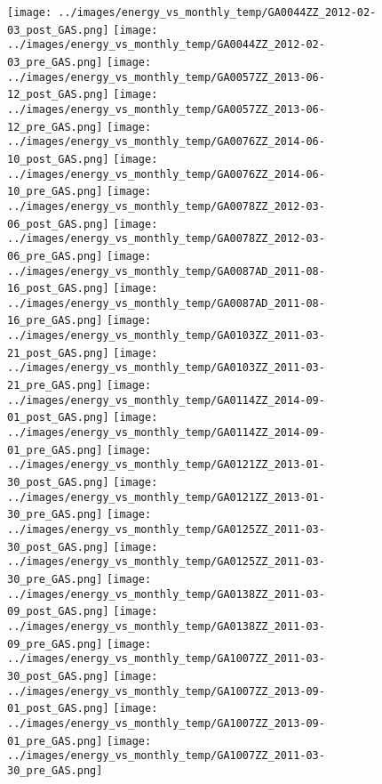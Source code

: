 \clearpage
\begin{figure}
\centering
\texttt{[image: ../images/energy\_vs\_monthly\_temp/GA0044ZZ\_2012-02-03\_post\_GAS.png]}
\texttt{[image: ../images/energy\_vs\_monthly\_temp/GA0044ZZ\_2012-02-03\_pre\_GAS.png]}
\texttt{[image: ../images/energy\_vs\_monthly\_temp/GA0057ZZ\_2013-06-12\_post\_GAS.png]}
\texttt{[image: ../images/energy\_vs\_monthly\_temp/GA0057ZZ\_2013-06-12\_pre\_GAS.png]}
\texttt{[image: ../images/energy\_vs\_monthly\_temp/GA0076ZZ\_2014-06-10\_post\_GAS.png]}
\texttt{[image: ../images/energy\_vs\_monthly\_temp/GA0076ZZ\_2014-06-10\_pre\_GAS.png]}
\texttt{[image: ../images/energy\_vs\_monthly\_temp/GA0078ZZ\_2012-03-06\_post\_GAS.png]}
\texttt{[image: ../images/energy\_vs\_monthly\_temp/GA0078ZZ\_2012-03-06\_pre\_GAS.png]}
\texttt{[image: ../images/energy\_vs\_monthly\_temp/GA0087AD\_2011-08-16\_post\_GAS.png]}
\texttt{[image: ../images/energy\_vs\_monthly\_temp/GA0087AD\_2011-08-16\_pre\_GAS.png]}
\texttt{[image: ../images/energy\_vs\_monthly\_temp/GA0103ZZ\_2011-03-21\_post\_GAS.png]}
\texttt{[image: ../images/energy\_vs\_monthly\_temp/GA0103ZZ\_2011-03-21\_pre\_GAS.png]}
\texttt{[image: ../images/energy\_vs\_monthly\_temp/GA0114ZZ\_2014-09-01\_post\_GAS.png]}
\texttt{[image: ../images/energy\_vs\_monthly\_temp/GA0114ZZ\_2014-09-01\_pre\_GAS.png]}
\texttt{[image: ../images/energy\_vs\_monthly\_temp/GA0121ZZ\_2013-01-30\_post\_GAS.png]}
\texttt{[image: ../images/energy\_vs\_monthly\_temp/GA0121ZZ\_2013-01-30\_pre\_GAS.png]}
\texttt{[image: ../images/energy\_vs\_monthly\_temp/GA0125ZZ\_2011-03-30\_post\_GAS.png]}
\texttt{[image: ../images/energy\_vs\_monthly\_temp/GA0125ZZ\_2011-03-30\_pre\_GAS.png]}
\texttt{[image: ../images/energy\_vs\_monthly\_temp/GA0138ZZ\_2011-03-09\_post\_GAS.png]}
\texttt{[image: ../images/energy\_vs\_monthly\_temp/GA0138ZZ\_2011-03-09\_pre\_GAS.png]}
\texttt{[image: ../images/energy\_vs\_monthly\_temp/GA1007ZZ\_2011-03-30\_post\_GAS.png]}
\texttt{[image: ../images/energy\_vs\_monthly\_temp/GA1007ZZ\_2013-09-01\_post\_GAS.png]}
\texttt{[image: ../images/energy\_vs\_monthly\_temp/GA1007ZZ\_2013-09-01\_pre\_GAS.png]}
\texttt{[image: ../images/energy\_vs\_monthly\_temp/GA1007ZZ\_2011-03-30\_pre\_GAS.png]}
\end{figure}
